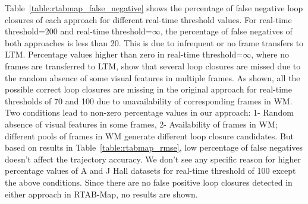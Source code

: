 Table~\ref{table:rtabmap_false_negative} shows the percentage of false negative loop closures of each approach for different {real-time threshold} values. 
For {real-time threshold}=200 and {real-time threshold}=$\infty$, the percentage of false negatives of both approaches is less than 20.
This is due to infrequent or no frame transfers to LTM.
Percentage values higher than zero in {real-time threshold}=$\infty$, where no frames are transferred to LTM, show that several loop closures are missed due to the random absence of some visual features in multiple frames.
As shown, all the possible correct loop closures are missing in the original approach for {real-time thresholds} of 70 and 100 due to unavailability of corresponding frames in WM. 
Two conditions lead to non-zero percentage values in our approach: 1- Random absence of visual features in some frames, 2- Availability of frames in WM; different pools of frames in WM generate different loop closure candidates.
But based on results in Table~\ref{table:rtabmap_rmse}, low percentage of false negatives doesn't affect the trajectory accuracy.
We don't see any specific reason for higher percentage values of A and J Hall datasets for {real-time threshold} of 100 except the above conditions.
Since there are no false positive loop closures detected in either approach in RTAB-Map, no results are shown.   
